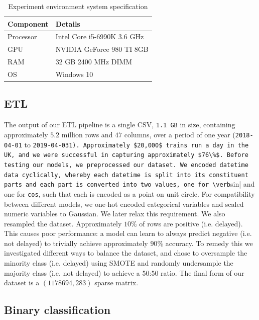 \documentclass[12pt,a4paper]{article}
\begin{document}
\begin{table}[htb]
\centering
\caption{Experiment environment system specification}
\label{table:experiment}
\begin{tabular}{|l|l|}
\hline
{\bf Component} & {\bf Details}                     \\ \hline
Processor & Intel Core i5-6990K 3.6 GHz \\ \hline
GPU       & NVIDIA GeForce 980 TI 8GB   \\ \hline
RAM       & 32 GB 2400 MHz DIMM         \\ \hline
OS        & Windows 10                  \\ \hline
\end{tabular}
\end{table}

\subsection{ETL}

The output of our ETL pipeline is a single CSV, \verb|1.1 GB| in size, containing approximately $5.2$ million rows and $47$ columns, over a period of one year (\verb|2018-04-01| to \verb|2019-04-031). Approximately $20,000$ trains run a day in the UK, and we were successful in capturing approximately $76\%$. Before testing our models, we preprocessed our dataset. We encoded datetime data cyclically, whereby each datetime is split into its constituent parts and each part is converted into two values, one for \verb|sin| and one for \verb|cos|, such that each is encoded as a point on unit circle. For compatibility between different models, we one-hot encoded categorical variables and scaled numeric variables to Gaussian. We later relax this requirement. We also resampled the dataset. Approximately $10\%$ of rows are positive (i.e. delayed). This causes poor performance: a model can learn to always predict negative (i.e. not delayed) to trivially achieve approximately $90$\% accuracy. To remedy this we investigated different ways to balance the dataset, and chose to oversample the minority class (i.e. delayed) using SMOTE \cite{chawla_et_al_2002} and randomly undersample the majority class (i.e. not delayed) to achieve a 50:50 ratio. The final form of our dataset is a $(1178694, 283)$ sparse matrix.

\subsection{Binary classification}
\end{document}
